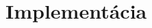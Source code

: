 \documentclass[12pt,a4paper]{report}
\let\openright=\clearpage
\def\chapwithtoc#1{
\chapter*{#1}
\addcontentsline{toc}{chapter}{#1}
}
\begin{document}
\part{Implementácia}









\begin{appendices}


\end{appendices}


\openright
\end{document}

